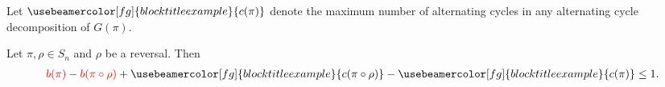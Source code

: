 \documentclass{beamer}
\theoremstyle{definition}
\def\padding{\vspace{0.5cm}}
\def\r{\textcolor{red}}
\def\g#1{{\usebeamercolor[fg]{block title example}{#1}}}
\begin{document}



\begin{frame}

Let $\g{c(\pi)}$ denote the maximum number of alternating cycles in any alternating cycle decomposition of $G(\pi)$. \pause\padding

\begin{theorem}
\label{thm:1}
Let $\pi, \rho \in S_n$ and $\rho$ be a reversal. \pause Then
\begin{align*}
    \r{b(\pi)} - \r{b(\pi \circ \rho)} + \g{c(\pi \circ \rho)} - \g{c(\pi)} \leq 1.
\end{align*}
\end{theorem}

\end{frame}
\end{document}

